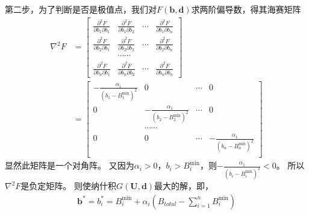 第二步，为了判断是否是极值点，我们对$F(\mathbf{b},\mathbf{d})$求两阶偏导数，得其海赛矩阵
\begin{align*}
    \nabla ^2 F &= \left[
    \begin{array}{cccc}
        \frac{\partial ^2F}{\partial b_{1} \partial b_1} & \frac{\partial ^2F}{\partial b_{1} \partial b_2} & \cdots &  \frac{\partial ^2F}{\partial b_{1} \partial b_n}\\
        \frac{\partial ^2F}{\partial b_{2} \partial b_1} & \frac{\partial ^2F}{\partial b_{2} \partial b_2} & \cdots &  \frac{\partial ^2F}{\partial b_{2} \partial b_n}\\
         & \cdots \cdots & & \\
        \frac{\partial ^2F}{\partial b_{n} \partial b_1} & \frac{\partial ^2F}{\partial b_{n} \partial b_2} & \cdots &  \frac{\partial ^2F}{\partial b_{n} \partial b_n}
    \end{array} 
    \right] \\
    & = \left[
    \begin{array}{cccc}
        -\frac{\alpha_1}{(b_1-B_1^{\min})^2} & 0 & \cdots & 0\\
        0& -\frac{\alpha_1}{(b_2-B_2^{\min})^2} &\cdots& 0\\
        &\cdots\cdots&&\\
        0& 0 &\cdots & -\frac{\alpha_1}{(b_n-B_n^{\min})^2}\\
    \end{array}
    \right]
\end{align*}
显然此矩阵是一个对角阵。
又因为$\alpha_i>0$，$b_i > B_i^{\min}$，则$-\frac{\alpha_1}{(b_i-B_i^{\min})^2}<0$。
所以$\nabla ^2 F$是负定矩阵。
则使纳什积$G(\mathbf{U},\mathbf{d})$最大的解，即，
\begin{align}
    \mathbf{b}^* = b_i^* = B_i^{\min} + \alpha_i \left( B_{total} - \sum_{i=1}^n B_i^{\min}  \right)
    \label{eqn:chap_nash:nbs}
\end{align}

